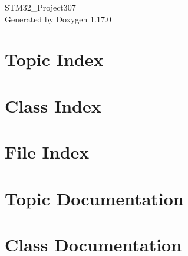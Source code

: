 \documentclass[twoside]{book}
\newcommand{\+}{\discretionary{\mbox{\scriptsize$\hookleftarrow$}}{}{}}
\newcommand{\clearemptydoublepage}{%
    \newpage{\pagestyle{empty}\cleardoublepage}%
  }
\begin{document}
  \raggedbottom
    \hypersetup{pageanchor=false,
                bookmarksnumbered=true,
                pdfencoding=unicode
               }
  \begin{titlepage}
  \vspace*{7cm}
  \begin{center}%
  {\Large STM32\+\_\+\+Project307}\\
  \vspace*{1cm}
  {\large Generated by Doxygen 1.17.0}\\
  \end{center}
  \end{titlepage}
  \clearemptydoublepage
  \tableofcontents
  \clearemptydoublepage
  \hypersetup{pageanchor=true}
\chapter{Topic Index}

\chapter{Class Index}

\chapter{File Index}

\chapter{Topic Documentation}



\chapter{Class Documentation}





\end{document}
